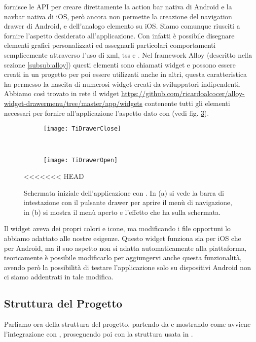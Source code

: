 			\tisdk{} fornisce le API per creare direttamente la action bar nativa 
			di Android e la navbar nativa di iOS, però ancora non permette la 
			creazione del navigation drawer di Android, e dell'analogo 
			elemento su iOS. Siamo comunque riusciti a fornire l'aspetto 
			desiderato all'applicazione.
			Con \tisdk{} infatti è possibile disegnare elementi grafici 
			personalizzati ed assegnarli particolari comportamenti 
			semplicemente attraverso l'uso di xml, tss e \js{}. Nel framework Alloy 
			(descritto nella sezione \ref{subsub:alloy}) questi elementi sono 
			chiamati widget e possono essere creati in un progetto per poi essere 
			utilizzati anche in altri, questa caratteristica ha permesso la nascita 
			di numerosi widget creati da sviluppatori indipendenti. 
			Abbiamo così trovato in rete il widget \url{https://github.com/ricardoalcocer/alloy-widget-drawermenu/tree/master/app/widgets}
			contenente tutti gli elementi necessari per fornire all'applicazione 
			l'aspetto dato con \kendomob{} (vedi fig. \ref{fig:tidrawer}).
			\begin{figure}[h]
				\centering
				\begin{subfigure}[b]{0.485\textwidth}
					\texttt{[image: TiDrawerClose]}
					\caption{}
					\label{fig:tiDrawerClose}
				\end{subfigure}
				~
				\begin{subfigure}[b]{0.485\textwidth}
					\texttt{[image: TiDrawerOpen]}
					\caption{}
					\label{fig:tiDrawerOpen}
				\end{subfigure}
				\caption{Schermata iniziale dell'applicazione con \tisdk{}. 
				In (a) si vede la barra di intestazione con il pulsante drawer per aprire 
				il menù di navigazione, in (b) si mostra il menù aperto 
				e l'effetto che ha sulla schermata.}
				\label{fig:tidrawer}
<<<<<<< HEAD
			\end{figure}  
			Il widget aveva dei propri colori e icone, ma modificando i file 
			opportuni lo abbiamo adattato alle nostre esigenze.
			Questo widget funziona sia per iOS che per Android, ma il suo aspetto 
			non si adatta automaticamente alla piattaforma, teoricamente è possibile
			modificarlo per aggiungervi anche questa funzionalità, avendo però 
			la possibilità di testare l'applicazione solo su dispositivi Android 
			non ci siamo addentrati in tale modifica.
		\subsection{Struttura del Progetto}
			Parliamo ora della struttura del progetto, partendo da \pg{} e mostrando 
			come avviene l'integrazione con \kendomob{}, proseguendo poi con 
			la struttura usata in \tisdk{}.
		
